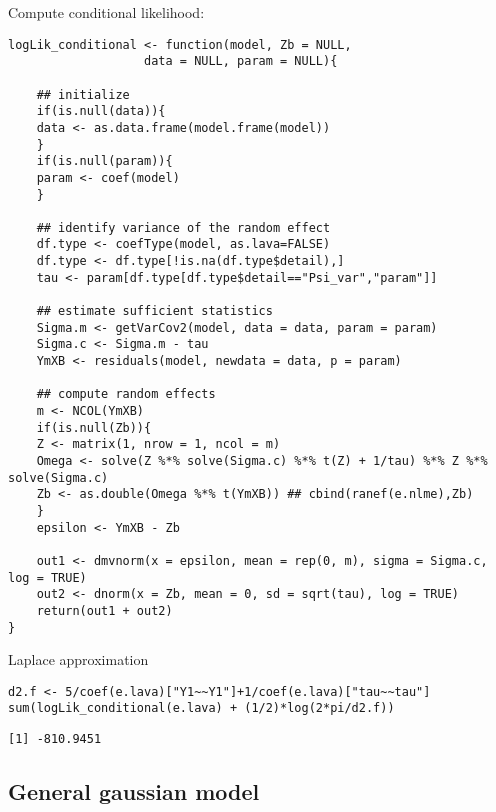 \documentclass[12pt]{article}
\begin{document}
Compute conditional likelihood:
\lstset{language=r,label= ,caption= ,captionpos=b,numbers=none}
\begin{lstlisting}
logLik_conditional <- function(model, Zb = NULL, 
			       data = NULL, param = NULL){

    ## initialize
    if(is.null(data)){
	data <- as.data.frame(model.frame(model))
    }
    if(is.null(param)){
	param <- coef(model)
    }

    ## identify variance of the random effect
    df.type <- coefType(model, as.lava=FALSE)
    df.type <- df.type[!is.na(df.type$detail),]
    tau <- param[df.type[df.type$detail=="Psi_var","param"]]

    ## estimate sufficient statistics
    Sigma.m <- getVarCov2(model, data = data, param = param)
    Sigma.c <- Sigma.m - tau
    YmXB <- residuals(model, newdata = data, p = param)

    ## compute random effects
    m <- NCOL(YmXB)
    if(is.null(Zb)){
	Z <- matrix(1, nrow = 1, ncol = m)
	Omega <- solve(Z %*% solve(Sigma.c) %*% t(Z) + 1/tau) %*% Z %*% solve(Sigma.c)
	Zb <- as.double(Omega %*% t(YmXB)) ## cbind(ranef(e.nlme),Zb)
    }
    epsilon <- YmXB - Zb

    out1 <- dmvnorm(x = epsilon, mean = rep(0, m), sigma = Sigma.c, log = TRUE)
    out2 <- dnorm(x = Zb, mean = 0, sd = sqrt(tau), log = TRUE)
    return(out1 + out2)
}
\end{lstlisting}

Laplace approximation
\lstset{language=r,label= ,caption= ,captionpos=b,numbers=none}
\begin{lstlisting}
d2.f <- 5/coef(e.lava)["Y1~~Y1"]+1/coef(e.lava)["tau~~tau"]
sum(logLik_conditional(e.lava) + (1/2)*log(2*pi/d2.f))
\end{lstlisting}

\begin{verbatim}
[1] -810.9451
\end{verbatim}

\clearpage

\subsection{General gaussian model}
\label{sec:orgc6ea907}
\end{document}
